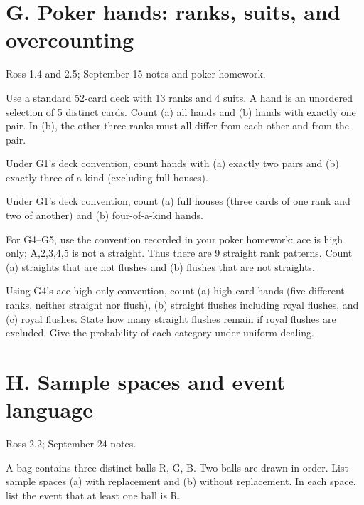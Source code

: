 \documentclass[11pt]{article}
\newcommand{\qid}[1]{\par\needspace{5\baselineskip}\noindent{\color{accent}\bfseries #1}\quad}
\newcommand{\source}[1]{{\small\color{muted}#1}\par}
\begin{document}
\clearpage
\section*{G. Poker hands: ranks, suits, and overcounting}
\source{Ross 1.4 and 2.5; September 15 notes and poker homework.}
\qid{G1} Use a standard 52-card deck with 13 ranks and 4 suits. A hand is an unordered selection of 5 distinct cards. Count (a) all hands and (b) hands with exactly one pair. In (b), the other three ranks must all differ from each other and from the pair.
\par\vspace{0.40in}

\qid{G2} Under G1's deck convention, count hands with (a) exactly two pairs and (b) exactly three of a kind (excluding full houses).
\par\vspace{0.40in}

\qid{G3} Under G1's deck convention, count (a) full houses (three cards of one rank and two of another) and (b) four-of-a-kind hands.
\par\vspace{0.40in}

\qid{G4} For G4--G5, use the convention recorded in your poker homework: ace is high only; A,2,3,4,5 is not a straight. Thus there are 9 straight rank patterns. Count (a) straights that are not flushes and (b) flushes that are not straights.
\par\vspace{0.40in}

\qid{G5} Using G4's ace-high-only convention, count (a) high-card hands (five different ranks, neither straight nor flush), (b) straight flushes including royal flushes, and (c) royal flushes. State how many straight flushes remain if royal flushes are excluded. Give the probability of each category under uniform dealing.
\par\vspace{0.40in}


\clearpage
\section*{H. Sample spaces and event language}
\source{Ross 2.2; September 24 notes.}
\qid{H1} A bag contains three distinct balls R, G, B. Two balls are drawn in order. List sample spaces (a) with replacement and (b) without replacement. In each space, list the event that at least one ball is R.
\par\vspace{0.40in}
\end{document}
